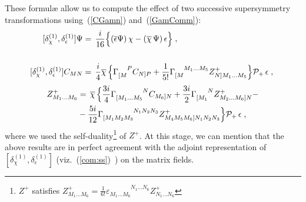 \documentclass[a4paper,11pt]{article}
\begin{document}
These formul\ae\; allow us to compute the effect of two successive supersymmetry
transformations using~(\ref{CGamn}) and~(\ref{GamComm}):
\begin{align}
\label{com:ssp}
[\delta_{\chi}^{(1)},\delta_{\epsilon}^{(1)}] \Psi 
&=\, \frac{i}{16} \Big\{( \overline{\epsilon} \Psi)\, \chi 
- (\overline{\chi}\, \Psi)\, \epsilon \Big\} \;,\notag  \\
&\notag \\
[\delta_{\chi}^{(1)},\delta_{\epsilon}^{(1)}] C_{MN} &= \,
\frac{i}{4}\overline{\chi}\, \Big\{\Gamma_{[M}^{\phantom{[M}P} C_{N]P} + 
\frac{1}{5!}\Gamma_{[M}^{\phantom{[M}M_1 \ldots M_5} Z^+_{N] M_1 \ldots M_5}\Big\}{\cal P}_+\, \epsilon\;,\
\end{align}
\begin{align}
[\delta_{\chi}^{(1)},\delta_{\epsilon}^{(1)}] Z^+_{M_1 \ldots M_6} &=\, 
\overline{\chi} \,\Big\{\frac{3i}{4} \Gamma_{[M_1 \ldots M_5}^{\phantom{[M_1 \ldots M_5}N} C_{M_6]N} 
+ \frac{3i}{2} \Gamma_{[M_1}^{\phantom{[M_1}N} Z^+_{M_2 \ldots M_6] N} -\notag\\ 
&- \frac{5i}{12} \Gamma_{[M_1 M_2 M_3}^{\phantom{[M_1 M_2 M_3}N_1 N_2 N_3} Z^+_{M_4 M_5 M_6] N_1 N_2 N_3} 
\Big\}{\cal P}_+\, \epsilon\;, \notag
\end{align}
where we used the self-duality\footnote{$Z^+$ satisfies $Z^+_{M_1 \ldots M_6} = 
\frac{1}{6!}\varepsilon_{M_1 \ldots M_6}^{\phantom{M_1 \ldots M_6}N_1 \ldots N_6}Z^+_{N_1 \ldots N_6}$} of $Z^+$.
At this stage, we can mention that the above results are in perfect agreement with the adjoint representation
of $[\delta_{\chi}^{(1)},\delta_{\epsilon}^{(1)}]$ (viz.~(\ref{com:ss})~) on the matrix fields. 
\end{document}
